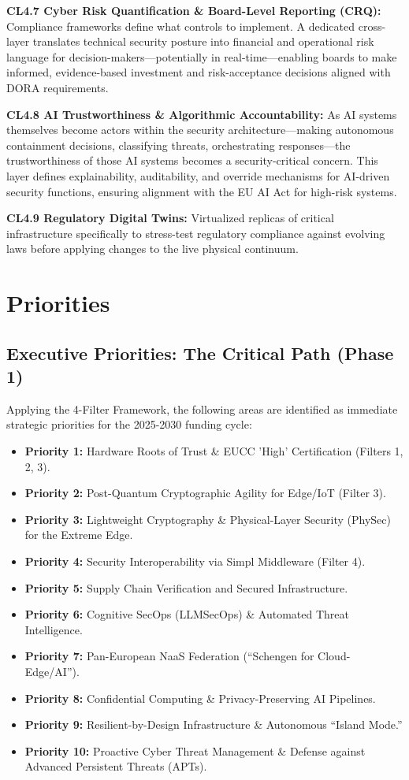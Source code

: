 \documentclass{ieeeaccess}
\begin{document}
\textbf{CL4.7 Cyber Risk Quantification \& Board-Level Reporting (CRQ):} Compliance frameworks define what controls to implement. A dedicated cross-layer translates technical security posture into financial and operational risk language for decision-makers---potentially in real-time---enabling boards to make informed, evidence-based investment and risk-acceptance decisions aligned with DORA requirements.

\textbf{CL4.8 AI Trustworthiness \& Algorithmic Accountability:} As AI systems themselves become actors within the security architecture---making autonomous containment decisions, classifying threats, orchestrating responses---the trustworthiness of those AI systems becomes a security-critical concern. This layer defines explainability, auditability, and override mechanisms for AI-driven security functions, ensuring alignment with the EU AI Act for high-risk systems.

\textbf{CL4.9 Regulatory Digital Twins:} Virtualized replicas of critical infrastructure specifically to stress-test regulatory compliance against evolving laws before applying changes to the live physical continuum.


\newpage

\section{Priorities}
\label{sec:priorities}
\subsection{Executive Priorities: The Critical Path (Phase 1)}
Applying the 4-Filter Framework, the following areas are identified as immediate strategic priorities for the 2025-2030 funding cycle:
\begin{itemize}
    \item \textbf{Priority 1:} Hardware Roots of Trust \& EUCC 'High' Certification (Filters 1, 2, 3).
    \item \textbf{Priority 2:} Post-Quantum Cryptographic Agility for Edge/IoT (Filter 3).
    \item \textbf{Priority 3:} Lightweight Cryptography \& Physical-Layer Security (PhySec) for the Extreme Edge.
    \item \textbf{Priority 4:} Security Interoperability via Simpl Middleware (Filter 4).
    \item \textbf{Priority 5:} Supply Chain Verification and Secured Infrastructure.
    \item \textbf{Priority 6:} Cognitive SecOps (LLMSecOps) \& Automated Threat Intelligence.
    \item \textbf{Priority 7:} Pan-European NaaS Federation (``Schengen for Cloud-Edge/AI'').
    \item \textbf{Priority 8:} Confidential Computing \& Privacy-Preserving AI Pipelines.
    \item \textbf{Priority 9:} Resilient-by-Design Infrastructure \& Autonomous ``Island Mode.''
    \item \textbf{Priority 10:} Proactive Cyber Threat Management \& Defense against Advanced Persistent Threats (APTs).
\end{itemize}
\end{document}
